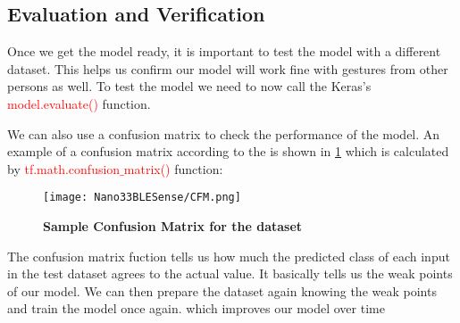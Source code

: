 %
% 

\subsection{Evaluation and Verification}

Once we get the model ready, it is important to test the model with a different dataset. This helps us confirm our model will work fine with gestures from other persons as well. To test the model we need to now call the Keras's \textcolor{red}{model.evaluate()} function.\cite{Warden:2020}



We can also use a confusion matrix to check the performance of the model. An example of a confusion matrix according to the \cite{Warden:2020} is shown in \ref{fig:CFM} which is calculated by \textcolor{red}{ tf.math.confusion$\_$matrix()} function:

\begin{figure}[h!]
    \texttt{[image: Nano33BLESense/CFM.png]}
    \caption{\textbf{ Sample Confusion Matrix for the dataset \cite{Warden:2020}}}
    \label{fig:CFM}
\end{figure}



The confusion matrix fuction tells us how much the predicted class of each input in the test dataset agrees to the actual value. It basically tells us the weak points of our model. We can then prepare the dataset again knowing the weak points and train the model once again.\cite{Warden:2020} which improves our model over time





